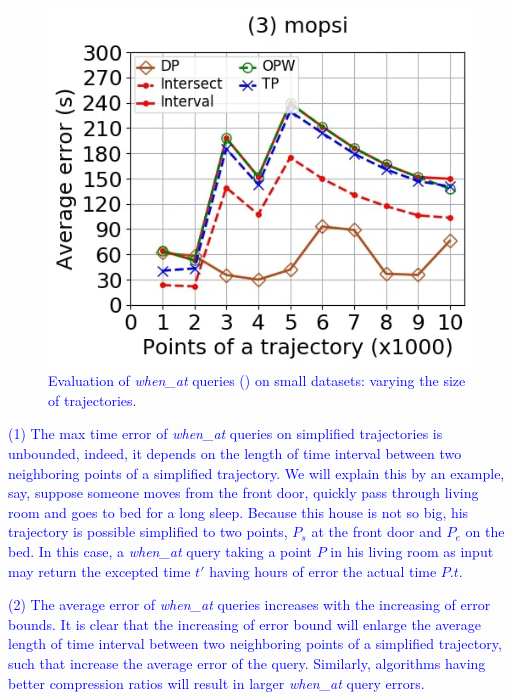 {\begin{figure}[tb!]
	\includegraphics[scale=0.250]{Figures/Exp-when-DAD-error-size-mopsi.jpg}	
	\vspace{-2ex}
	\caption{\small \textcolor{blue}{Evaluation of \emph{when\_at} queries (\dad) on small datasets: varying the size of trajectories.}}
	\label{fig:query-when-dad-size}
	\vspace{-1ex}
\end{figure}

\ni \textcolor{blue}{(1) The max time error of \emph{when\_at} queries on simplified trajectories is unbounded, indeed, it depends on the length of time interval between two neighboring points of a simplified trajectory. We will explain this by an example, say, suppose someone moves from the front door, quickly pass through living room and goes to bed for a long sleep. Because this house is not so big, his trajectory is possible simplified to two points, \ie $P_s$ at the front door and $P_e$ on the bed. In this case, a \emph{when\_at} query taking a point $P$ in his living room as input may return the excepted time $t'$ having hours of error \wrt the actual time $P.t$.}

\ni \textcolor{blue}{(2) The average error of \emph{when\_at} queries increases with the increasing of error bounds. It is clear that the increasing of error bound will enlarge the average length of time interval between two neighboring points of a simplified trajectory, such that increase the average error of the query. Similarly, algorithms having better compression ratios will result in larger \emph{when\_at} query errors.}
	
}
